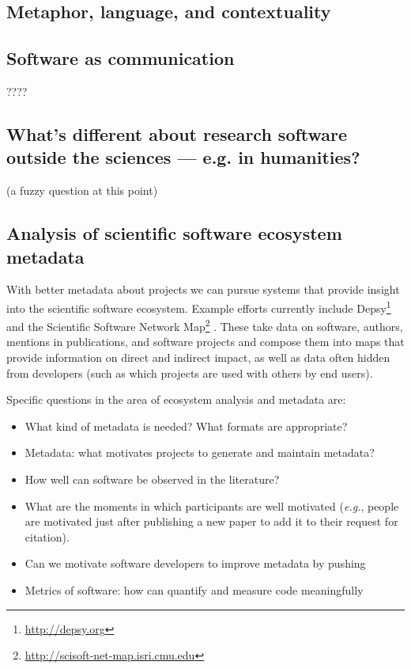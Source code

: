 \documentclass[a4paper,UKenglish]{dagman}
\newcommand{\eg}{\emph{e.g.},\xspace}
\begin{document}
\subsection{Metaphor, language, and contextuality}

\subsection{Software as communication}

 ????


\subsection{What's different about research software outside the sciences --- e.g. in humanities?}

(a fuzzy question at this point)

\subsection{Analysis of scientific software ecosystem metadata}

With better metadata about projects we can pursue systems that provide insight into the scientific software ecosystem.
Example efforts currently include Depsy\footnote{\url{http://depsy.org}}  and the Scientific Software Network Map\footnote{\url{http://scisoft-net-map.isri.cmu.edu}} .
These take data on software, authors, mentions in publications, and software projects and compose them into maps that provide information on direct and indirect impact, as well as data often hidden from developers (such as which projects are used with others by end users).

Specific questions in the area of ecosystem analysis and metadata are:

\begin{itemize}
\item What kind of metadata is needed? What formats are appropriate?
\item Metadata: what motivates projects to generate and maintain metadata?
\item How well can software be observed in the literature?
\item What are the moments in which participants are well motivated (\eg people are motivated just after publishing a new paper to add it to their request for citation).
\item Can we motivate software developers to improve metadata by pushing 
\item Metrics of software: how can quantify and measure code meaningfully
\end{itemize}
\end{document}

